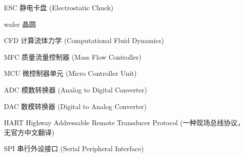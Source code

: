 \begin{denotation}

\item[ESC] 静电卡盘 (Electrostatic Chuck)
\item[wafer] 晶圆
\item[CFD] 计算流体力学 (Computational Fluid Dynamics)
\item[MFC] 质量流量控制器 (Mass Flow Controller)
\item[MCU] 微控制器单元 (Micro Controller Unit)
\item[ADC] 模数转换器 (Analog to Digital Converter)
\item[DAC] 数模转换器 (Digital to Analog Converter)
\item[HART] Highway Addressable Remote Transducer Protocol (一种现场总线协议，无官方中文翻译)
\item[SPI] 串行外设接口 (Serial Peripheral Interface)


\end{denotation}
